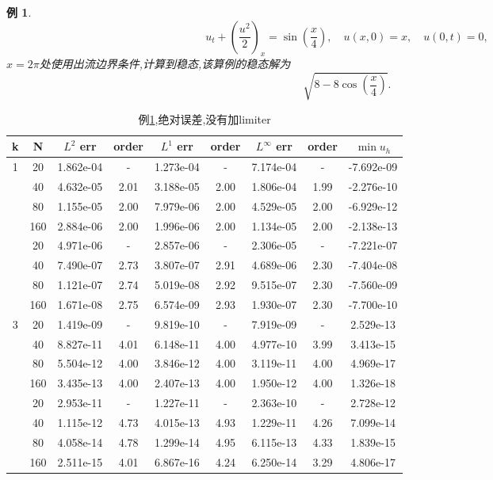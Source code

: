 \documentclass[a4paper, 11pt]{ctexart}
\numberwithin{equation}{section}
\numberwithin{figure}{section}
\newtheorem{example}{例}
\begin{document}
\begin{example}\label{ex:2}
\begin{equation}
  u_t+(\frac{u^2}{2})_x=\sin(\frac{x}{4}),\quad u(x,0)=x,\quad u(0,t)=0,
\end{equation}
$x=2\pi$处使用出流边界条件,计算到稳态,该算例的稳态解为
\begin{equation*}
  \sqrt{8-8\cos(\dfrac x4)}.
\end{equation*}
\end{example}

\begin{table}[H]
  \centering
  \begin{tabular}{c|c|c|c|c|c|c|c|c} \toprule
 k  &  N &  $L^2$ err& order&$L^1$ err  &order & $L^\infty$ err&order& $\min u_h$ \\ \midrule
 \multirow{5}{*}{1}  &  20 & 1.862e-04 &  -   & 1.273e-04 &  -   & 7.174e-04 &  -   & -7.692e-09 \\
                     &  40 & 4.632e-05 & 2.01 & 3.188e-05 & 2.00 & 1.806e-04 & 1.99 & -2.276e-10 \\
                     &  80 & 1.155e-05 & 2.00 & 7.979e-06 & 2.00 & 4.529e-05 & 2.00 & -6.929e-12 \\
                     & 160 & 2.884e-06 & 2.00 & 1.996e-06 & 2.00 & 1.134e-05 & 2.00 & -2.138e-13 \\ \midrule
 \multirow{5}{*}{2}  &  20 & 4.971e-06 &  -   & 2.857e-06 &  -   & 2.306e-05 & -    & -7.221e-07 \\
                     &  40 & 7.490e-07 & 2.73 & 3.807e-07 & 2.91 & 4.689e-06 & 2.30 & -7.404e-08 \\
                     &  80 & 1.121e-07 & 2.74 & 5.019e-08 & 2.92 & 9.515e-07 & 2.30 & -7.560e-09 \\
                     & 160 & 1.671e-08 & 2.75 & 6.574e-09 & 2.93 & 1.930e-07 & 2.30 & -7.700e-10 \\ \midrule
 \multirow{5}{*}{3}  &  20 & 1.419e-09 &  -   & 9.819e-10 &  -   & 7.919e-09 & -    & 2.529e-13  \\
                     &  40 & 8.827e-11 & 4.01 & 6.148e-11 & 4.00 & 4.977e-10 & 3.99 & 3.413e-15  \\
                     &  80 & 5.504e-12 & 4.00 & 3.846e-12 & 4.00 & 3.119e-11 & 4.00 & 4.969e-17  \\
                     & 160 & 3.435e-13 & 4.00 & 2.407e-13 & 4.00 & 1.950e-12 & 4.00 & 1.326e-18  \\ \midrule
 \multirow{5}{*}{4}  &  20 & 2.953e-11 &  -   & 1.227e-11 &  -   & 2.363e-10 & -    & 2.728e-12  \\
                     &  40 & 1.115e-12 & 4.73 & 4.015e-13 & 4.93 & 1.229e-11 & 4.26 & 7.099e-14  \\
                     &  80 & 4.058e-14 & 4.78 & 1.299e-14 & 4.95 & 6.115e-13 & 4.33 & 1.839e-15  \\
                     & 160 & 2.511e-15 & 4.01 & 6.867e-16 & 4.24 & 6.250e-14 & 3.29 & 4.806e-17  \\ \bottomrule
  \end{tabular}
  \caption{例\ref{ex:2},绝对误差,没有加limiter}
\end{table}
\end{document}
